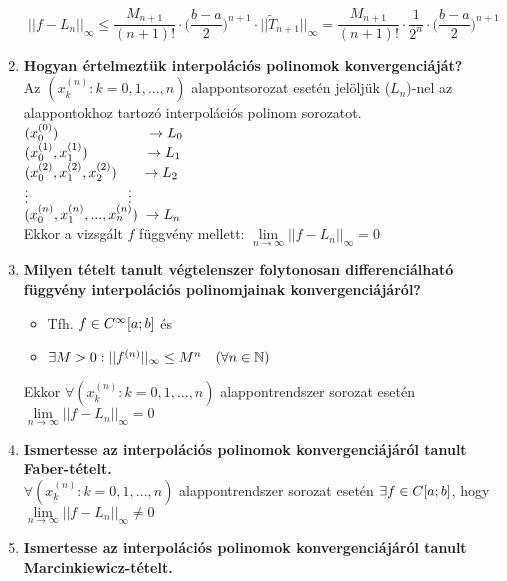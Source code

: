 \documentclass{article}
\begin{document}
\begin{enumerate}
	\[||f-L_n||_{\infty}\leq\frac{M_{n+1}}{(n+1)!}\cdot\bigg(\frac{b-a}{2}\bigg)^{n+1}
	\cdot||\tilde{T}_{n+1}||_{\infty}=\frac{M_{n+1}}{(n+1)!}\cdot\frac{1}{2^n}
	\cdot\bigg(\frac{b-a}{2}\bigg)^{n+1}\]
	\item\textbf{Hogyan értelmeztük interpolációs polinomok konvergenciáját?}\\[0.1cm]
	Az $(x_k^{(n)}:k=0,1,...,n)$ alappontsorozat esetén jelöljük ($L_n$)-nel
	az alappontokhoz tartozó interpolációs polinom sorozatot.\\[0.1cm]
	\hspace*{2cm}$(x_0^{(0)})\hspace{2.2cm}\to L_0$\\[0.2cm]
	\hspace*{2cm}$(x_0^{(1)},x_1^{(1)})\hspace{1.4cm}\to L_1$\\[0.2cm]
	\hspace*{2cm}$(x_0^{(2)},x_1^{(2)},x_2^{(2)})\hspace{0.6cm}\to L_2$\\[0.1cm]
	\hspace*{3cm}$\vdots\hspace{2.5cm}\vdots$\\[0.1cm]
	\hspace*{2cm}$(x_0^{(n)},x_1^{(n)},...,x_n^{(n)})\hspace{0.1cm}\to L_n$\\[0.3cm]
	Ekkor a vizsgált $f$ függvény mellett: $\lim\limits_{n\to\infty}||f-L_n||_{\infty}=0$
	\item\textbf{Milyen tételt tanult végtelenszer folytonosan differenciálható függvény interpolációs polinomjainak konvergenciájáról?}
	\begin{itemize}
		\item Tfh. $f\in C^\infty[a;b]$ és
		\item $\exists M>0:||f^{(n)}||_\infty\leq M^n\quad(\forall n\in\mathbb{N})$
	\end{itemize}
	Ekkor $\forall(x_k^{(n)}:k=0,1,...,n)$ alappontrendszer sorozat esetén
	$\lim\limits_{n\to\infty}||f-L_n||_{\infty}=0$
	\item\textbf{Ismertesse az interpolációs polinomok konvergenciájáról tanult Faber-tételt.}\\[0.2cm]
	$\forall(x_k^{(n)}:k=0,1,...,n)$ alappontrendszer sorozat esetén $\exists
	f\in C[a;b]$, hogy $\lim\limits_{n\to\infty}||f-L_n||_{\infty}\neq0$
	\item\textbf{Ismertesse az interpolációs polinomok konvergenciájáról tanult Marcinkiewicz-tételt.}\\[0.2cm]

\end{enumerate}
\end{document}
